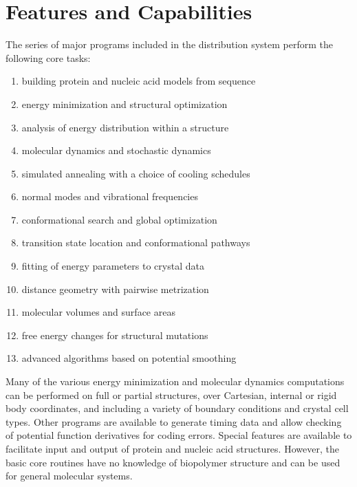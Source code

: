 \documentclass[letterpaper,11pt,english]{sphinxmanual}
\begin{document}
\section{Features and Capabilities}
\label{\detokenize{text/introduction:features-and-capabilities}}
The series of major programs included in the distribution system perform the following core tasks:
\begin{enumerate}
%
\item {} 
building protein and nucleic acid models from sequence

\item {} 
energy minimization and structural optimization

\item {} 
analysis of energy distribution within a structure

\item {} 
molecular dynamics and stochastic dynamics

\item {} 
simulated annealing with a choice of cooling schedules

\item {} 
normal modes and vibrational frequencies

\item {} 
conformational search and global optimization

\item {} 
transition state location and conformational pathways

\item {} 
fitting of energy parameters to crystal data

\item {} 
distance geometry with pairwise metrization

\item {} 
molecular volumes and surface areas

\item {} 
free energy changes for structural mutations

\item {} 
advanced algorithms based on potential smoothing

\end{enumerate}

Many of the various energy minimization and molecular dynamics computations can be performed on full or partial structures, over Cartesian, internal or rigid body coordinates, and including a variety of boundary conditions and crystal cell types. Other programs are available to generate timing data and allow checking of potential function derivatives for coding errors. Special features are available to facilitate input and output of protein and nucleic acid structures. However, the basic core routines have no knowledge of biopolymer structure and can be used for general molecular systems.
\end{document}
